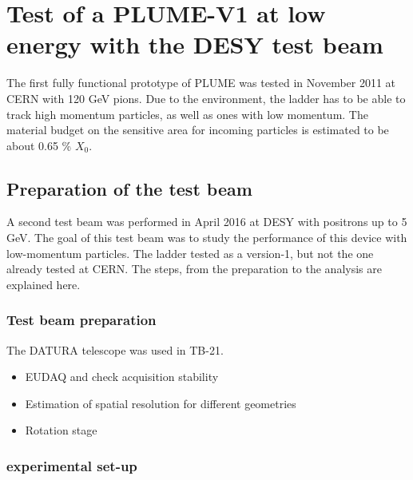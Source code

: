 \chapter{Test of a PLUME-V1 at low energy with the DESY test beam}

  The first fully functional prototype of \gls{PLUME} was tested in November 2011 at CERN with 120 GeV pions. 
  Due to the environment, the ladder has to be able to track high momentum particles, as well as ones with low momentum.
  The material budget on the sensitive area for incoming particles is estimated to be about 0.65 \% $X_0$.


\minitoc

  \section{Preparation of the test beam}

   A second test beam was performed in April 2016 at DESY with positrons up to 5 GeV. 
   The goal of this test beam was to study the performance of this device with low-momentum particles.
   The ladder tested as a version-1, but not the one already tested at CERN.
   The steps, from the preparation to the analysis are explained here.

    \subsection{Test beam preparation}

    The DATURA telescope was used in TB-21. 
    \begin{itemize}
      \item EUDAQ and check acquisition stability
      \item Estimation of spatial resolution for different geometries
      \item Rotation stage
    \end{itemize}

    \begin{figure}
    \end{figure}

    \begin{figure}
    \end{figure}

    \subsection{experimental set-up}

